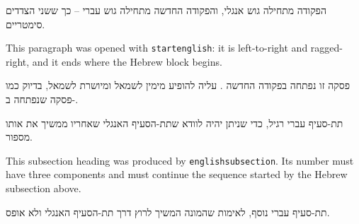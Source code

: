 \documentclass{hebrew-academic-template}
\begin{document}
הפקודה  מתחילה גוש אנגלי, והפקודה החדשה
 מתחילה גוש עברי -- כך ששני הצדדים סימטריים.

\startenglish
This paragraph was opened with \texttt{startenglish}: it is left-to-right and
ragged-right, and it ends where the Hebrew block begins.
\stopenglish

\starthebrew
פסקה זו נפתחה בפקודה החדשה . עליה להופיע מימין
לשמאל ומיושרת לשמאל, בדיוק כמו פסקה שנפתחה ב-.
\stophebrew

תת-סעיף עברי רגיל, כדי שניתן יהיה לוודא שתת-הסעיף האנגלי שאחריו ממשיך את אותו מספור.

This subsection heading was produced by \texttt{englishsubsection}. Its number must have
three components and must continue the sequence started by the Hebrew subsection above.

תת-סעיף עברי נוסף, לאימות שהמונה המשיך לרוץ דרך תת-הסעיף האנגלי ולא אופס.


\newpage
\printhebrewbibliography
\printenglishbibliography
\end{document}
